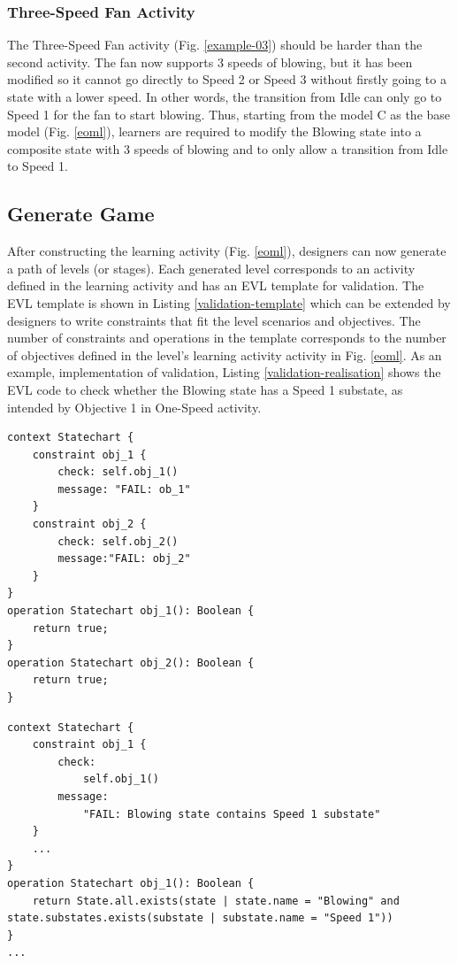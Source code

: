 \documentclass[conference]{IEEEtran}
\begin{document}
\subsubsection{Three-Speed Fan Activity}
The Three-Speed Fan activity (Fig. \ref{example-03}) should be harder than the second activity. The fan now supports 3 speeds of blowing, but it has been modified so it cannot go directly to Speed 2 or Speed 3 without firstly going to a state with a lower speed. In other words, the transition from Idle can only go to Speed 1 for the fan to start blowing. Thus, starting from the model C as the base model (Fig. \ref{eoml}), learners are required to modify the Blowing state into a composite state with 3 speeds of blowing and to only allow a transition from Idle to Speed 1.

\subsection{Generate Game}
After constructing the learning activity (Fig. \ref{eoml}), designers can now generate a path of levels (or stages). Each generated level corresponds to an activity defined in the learning activity and has an EVL template for validation. The EVL template is shown in Listing \ref{validation-template} which can be extended by designers to write constraints that fit the level scenarios and objectives. The number of constraints and operations in the template corresponds to the number of objectives defined in the level's learning activity activity in Fig. \ref{eoml}. As an example, implementation of validation, Listing \ref{validation-realisation} shows the EVL code to check whether the Blowing state has a Speed 1 substate, as intended by Objective 1 in One-Speed activity.   

\begin{lstlisting}[style=interfaces,caption={Validation template for objectives in One-Speed Fan activity/level.},label=validation-template]
context Statechart {
    constraint obj_1 {
        check: self.obj_1()
        message: "FAIL: ob_1"
    }
    constraint obj_2 {
        check: self.obj_2()
        message:"FAIL: obj_2"
    }        
}
operation Statechart obj_1(): Boolean {
    return true;
}
operation Statechart obj_2(): Boolean {
    return true;
}
\end{lstlisting} 


\begin{lstlisting}[style=interfaces,caption={Validation realisation for Objective 1 in One-Speed Fan activity/level.}, label=validation-realisation]
context Statechart {
    constraint obj_1 {
        check: 
            self.obj_1()
        message:
            "FAIL: Blowing state contains Speed 1 substate"
    }
    ...
}
operation Statechart obj_1(): Boolean {
    return State.all.exists(state | state.name = "Blowing" and state.substates.exists(substate | substate.name = "Speed 1"))
}
...
\end{lstlisting} 
\end{document}
